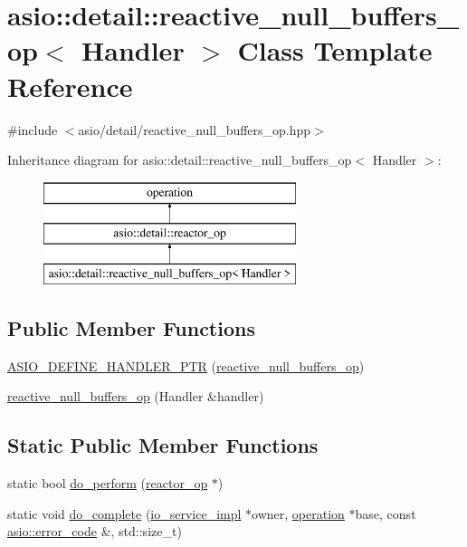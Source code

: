 \hypertarget{classasio_1_1detail_1_1reactive__null__buffers__op}{}\section{asio\+:\+:detail\+:\+:reactive\+\_\+null\+\_\+buffers\+\_\+op$<$ Handler $>$ Class Template Reference}
\label{classasio_1_1detail_1_1reactive__null__buffers__op}


{\ttfamily \#include $<$asio/detail/reactive\+\_\+null\+\_\+buffers\+\_\+op.\+hpp$>$}

Inheritance diagram for asio\+:\+:detail\+:\+:reactive\+\_\+null\+\_\+buffers\+\_\+op$<$ Handler $>$\+:\begin{figure}[H]
\begin{center}
\leavevmode
\includegraphics[height=3.000000cm]{classasio_1_1detail_1_1reactive__null__buffers__op}
\end{center}
\end{figure}
\subsection*{Public Member Functions}
\begin{DoxyCompactItemize}
\item 
\hyperlink{classasio_1_1detail_1_1reactive__null__buffers__op_abcaea729e879dadd35c4253a002c0836}{A\+S\+I\+O\+\_\+\+D\+E\+F\+I\+N\+E\+\_\+\+H\+A\+N\+D\+L\+E\+R\+\_\+\+P\+T\+R} (\hyperlink{classasio_1_1detail_1_1reactive__null__buffers__op}{reactive\+\_\+null\+\_\+buffers\+\_\+op})
\item 
\hyperlink{classasio_1_1detail_1_1reactive__null__buffers__op_a294ef6134f3073da196cbff42b28ea97}{reactive\+\_\+null\+\_\+buffers\+\_\+op} (Handler \&handler)
\end{DoxyCompactItemize}
\subsection*{Static Public Member Functions}
\begin{DoxyCompactItemize}
\item 
static bool \hyperlink{classasio_1_1detail_1_1reactive__null__buffers__op_a1ae16716e911d6409489dc0d4ac0af8a}{do\+\_\+perform} (\hyperlink{classasio_1_1detail_1_1reactor__op}{reactor\+\_\+op} $\ast$)
\item 
static void \hyperlink{classasio_1_1detail_1_1reactive__null__buffers__op_aa84f594f17e11b4e680cfe82928c0b72}{do\+\_\+complete} (\hyperlink{namespaceasio_1_1detail_a6d61d9b8e53c11288be549d82aec5a42}{io\+\_\+service\+\_\+impl} $\ast$owner, \hyperlink{namespaceasio_1_1detail_a338968609bec20e37145309f8f9ec936}{operation} $\ast$base, const \hyperlink{classasio_1_1error__code}{asio\+::error\+\_\+code} \&, std\+::size\+\_\+t)
\end{DoxyCompactItemize}
